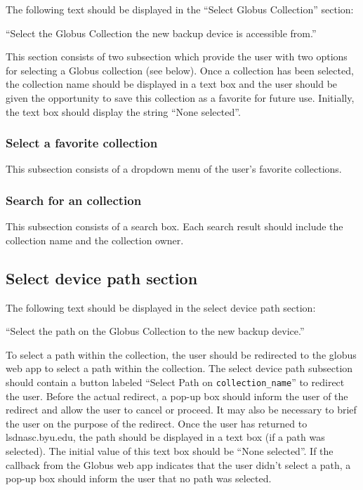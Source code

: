The following text should be displayed in the ``Select Globus Collection'' section:

\vspace{3mm}
``Select the Globus Collection the new backup device is accessible from.''
\vspace{3mm}

\noindent This section consists of two subsection which provide the user with two options for 
selecting a Globus collection (see below). Once a collection has been selected, the 
collection name should be displayed in a text box and the user should be given the 
opportunity to save this collection as a favorite for future use. Initially, the text 
box should display the string ``None selected''.

\subsubsection{Select a favorite collection}

This subsection consists of a dropdown menu of the user's favorite collections.

\subsubsection{Search for an collection}

This subsection consists of a search box. Each search result should include the collection 
name and the collection owner.

\subsection{Select device path section}

The following text should be displayed in the select device path section:

\vspace{3mm}
``Select the path on the Globus Collection to the new backup device.''
\vspace{3mm}

\noindent To select a path within the collection, the user should be redirected to the
globus web app to select a path within the collection. The select device path subsection 
should contain a button labeled ``Select Path on \texttt{collection\_name}'' to redirect 
the user. Before the actual redirect, a pop-up box should inform the user of the redirect
and allow the user to cancel or proceed. It may also be necessary to brief the user on the
purpose of the redirect. Once the user has returned to lsdnasc.byu.edu, the path should be 
displayed in a text box (if a path was selected). The initial value of this text box should 
be ``None selected''. If the callback from the Globus web app indicates that the user
didn't select a path, a pop-up box should inform the user that no path was selected.

